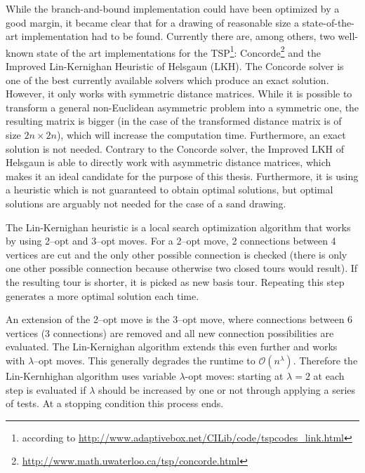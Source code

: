 
While the branch-and-bound implementation could have been optimized by a good margin, it became clear that for a drawing of reasonable size a state-of-the-art implementation had to be found. Currently there are, among others, two well-known state of the art implementations for the TSP\footnote{according to \url{http://www.adaptivebox.net/CILib/code/tspcodes_link.html}}: Concorde\footnote{\url{http://www.math.uwaterloo.ca/tsp/concorde.html}} and the Improved Lin-Kernighan Heuristic of Helsgaun (LKH)\cite{helsgaun2000effective}\cite{kernighan1970efficient}. The Concorde solver is one of the best currently available solvers which produce an exact solution\cite{hornik2007tsp}. However, it only works with symmetric distance matrices. While it is possible to transform a general non-Euclidean asymmetric problem into a symmetric one, the resulting matrix is bigger (in the case of \cite{kumar1996asymmetric} the transformed distance matrix is of size $2n \times 2n$), which will increase the computation time. Furthermore, an exact solution is not needed. Contrary to the Concorde solver, the Improved LKH of Helsgaun is able to directly work with asymmetric distance matrices, which makes it an ideal candidate for the purpose of this thesis. Furthermore, it is using a heuristic which is not guaranteed to obtain optimal solutions, but optimal solutions are arguably not needed for the case of a sand drawing.

The Lin-Kernighan heuristic is a local search optimization algorithm that works by using 2--opt and 3--opt moves. For a 2--opt move, 2 connections between 4 vertices are cut and the only other possible connection is checked (there is only one other possible connection because otherwise two closed tours would result). If the resulting tour is shorter, it is picked as new basis tour. Repeating this step generates a more optimal solution each time.

An extension of the 2--opt move is the 3--opt move, where connections between 6 vertices (3 connections) are removed and all new connection possibilities are evaluated. The Lin-Kernighan algorithm extends this even further and works with $\lambda\text{--opt}$ moves. This generally degrades the runtime to $\mathcal{O}(n^\lambda)$. Therefore the Lin-Kernhighan algorithm uses variable $\lambda\text{-opt}$ moves: starting at $\lambda=2$ at each step is evaluated if $\lambda$ should be increased by one or not through applying a series of tests. At a stopping condition this process ends.

